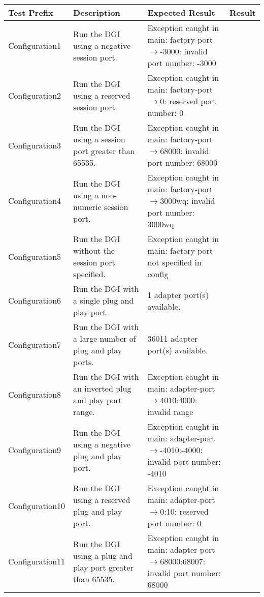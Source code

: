 \documentclass{article}
\begin{document}
%
\begin{center}
\begin{footnotesize}
\begin{longtable}{|p{3cm}|p{4cm}|p{10cm}|c|}
    \hline
    Test Prefix & Description & Expected Result & Result \\ \hline \endhead \hline \endfoot
    Configuration1 & Run the DGI using a negative session port. & Exception caught in main: factory-port$\rightarrow$-3000: invalid port number: -3000 & \\
    Configuration2 & Run the DGI using a reserved session port. & Exception caught in main: factory-port$\rightarrow$0: reserved port number: 0 & \\
    Configuration3 & Run the DGI using a session port greater than 65535. & Exception caught in main: factory-port$\rightarrow$68000: invalid port number: 68000 & \\
    Configuration4 & Run the DGI using a non-numeric session port. & Exception caught in main: factory-port$\rightarrow$3000wq: invalid port number: 3000wq & \\
    Configuration5 & Run the DGI without the session port specified. & Exception caught in main: factory-port not specified in config & \\
    Configuration6 & Run the DGI with a single plug and play port. & 1 adapter port(s) available. & \\
    Configuration7 & Run the DGI with a large number of plug and play ports. & 36011 adapter port(s) available. & \\
    Configuration8 & Run the DGI with an inverted plug and play port range. & Exception caught in main: adapter-port$\rightarrow$4010:4000: invalid range & \\
    Configuration9 & Run the DGI using a negative plug and play port. & Exception caught in main: adapter-port$\rightarrow$-4010:-4000: invalid port number: -4010 & \\
    Configuration10 & Run the DGI using a reserved plug and play port. & Exception caught in main: adapter-port$\rightarrow$0:10: reserved port number: 0 & \\
    Configuration11 & Run the DGI using a plug and play port greater than 65535. & Exception caught in main: adapter-port$\rightarrow$68000:68007: invalid port number: 68000 & \\

\end{longtable}
\end{footnotesize}
\end{center}
\end{document}
